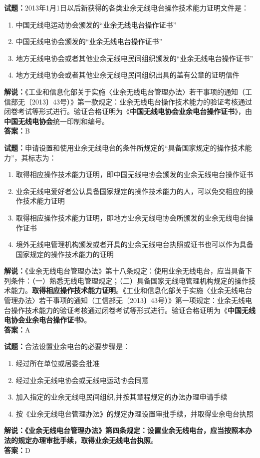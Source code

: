 \documentclass{ctexbook}
\begin{document}
\noindent\textbf{试题：}2013年1月1日以后新获得的各类业余无线电台操作技术能力证明文件是：
\begin{enumerate}[leftmargin=3em]
	\item 中国无线电运动协会颁发的“业余无线电台操作证书”
	\item 中国无线电协会颁发的“业余无线电台操作证书”
	\item 地方无线电协会或者其他业余无线电民间组织颁发的“业余无线电台操作证书”
	\item 地方无线电协会或者其他业余无线电民间组织出具的盖有公章的证明信件
\end{enumerate}
\noindent\textbf{解说：}《工业和信息化部关于实施〈业余无线电台管理办法〉若干事项的通知（工信部无〔2013〕43号）》第一款规定：业余无线电台操作技术能力的验证考核通过闭卷考试等形式进行。验证合格证明为《\textbf{中国无线电协会业余电台操作证书}》，由\textbf{中国无线电协会}统一印制和编号。\\\noindent\textbf{答案：}B



\bigskip


\noindent\textbf{试题：}申请设置和使用业余无线电台的条件所规定的“具备国家规定的操作技术能力”，其标志为：
\begin{enumerate}[leftmargin=3em]
	\item 取得相应操作技术能力证明，即中国无线电协会颁发的业余无线电台操作证书
	\item 业余无线电爱好者公认具备国家规定的操作技术能力的人，可以免交相应的操作技术能力证明
	\item 取得相应操作技术能力证明，即地方业余无线电协会所颁发的业余无线电台操作证书
	\item 境外无线电管理机构颁发或者开具的业余无线电台执照或证书也可以作为具备国家规定的操作技术能力的证明
\end{enumerate}
\noindent\textbf{解说：}《业余无线电台管理办法》第十八条规定：使用业余无线电台，应当具备下列条件：（一）熟悉无线电管理规定；（二）具备国家无线电管理机构规定的操作技术能力。\textbf{取得相应操作技术能力证明}。《工业和信息化部关于实施〈业余无线电台管理办法〉若干事项的通知（工信部无〔2013〕43号）》第一项规定：业余无线电台操作技术能力的验证考核通过闭卷考试等形式进行。验证合格证明为《\textbf{中国无线电协会业余电台操作证书}》。\\\noindent\textbf{答案：}A


\bigskip


\noindent\textbf{试题：}合法设置业余电台的必要步骤是：
\begin{enumerate}[leftmargin=3em]
	\item 经过所在单位或居委会批准
	\item 经过业余无线电协会或无线电运动协会同意
	\item 加入指定的业余无线电民间组织,并按其章程规定的办法办理申请手续
	\item 按《业余无线电台管理办法》的规定办理设置审批手续，并取得业余电台执照
\end{enumerate}
\noindent\textbf{解说：}\textbf{《业余无线电台管理办法》第四条规定：设置业余无线电台，应当按照本办法的规定办理审批手续，取得业余无线电台执照}。\\\noindent\textbf{答案：}D
\end{document}
